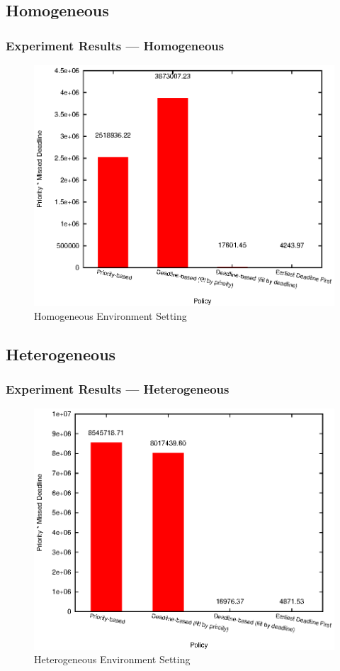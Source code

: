 \subsection{Homogeneous}
\begin{frame}
  \frametitle{Experiment Results --- Homogeneous}
  \begin{figure}[htbp]
    \centering
    \includegraphics[width=\textwidth,height=0.7\textheight,keepaspectratio]{figures/homo.eps}
    \caption{Homogeneous Environment Setting}
  \end{figure}
\end{frame}

\subsection{Heterogeneous}
\begin{frame}
  \frametitle{Experiment Results --- Heterogeneous}
  \begin{figure}[htbp]
    \centering
    \includegraphics[width=\textwidth,height=0.7\textheight,keepaspectratio]{figures/hetero.eps}
    \caption{Heterogeneous Environment Setting}
  \end{figure}
\end{frame}

